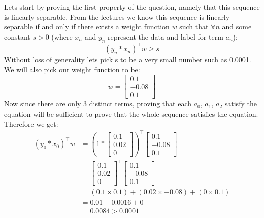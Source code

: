 \documentclass{article}
\begin{document}
\begin{titlepage}
Lets start by proving the first property of the question, namely that this sequence is linearly separable. From the lectures we know this sequence is linearly separable if and only if there exists a weight function $w$ such that $\forall n$ and some constant $s >0 $ (where $x_n$ and $y_n$ represent the data and label for term $a_n$):
\[ (y_n*x_n)^\top w \geq s \]
Without loss of generality lets pick s to be a very small number such as 0.0001. We will also pick our weight function to be:
\[ w = \begin{bmatrix}
0.1\\
-0.08\\
0.1
\end{bmatrix} \]
Now since there are only 3 distinct terms, proving that each $a_0$, $a_1$, $a_2$ satisfy the equation will be sufficient to prove that the whole sequence satisfies the equation. Therefore we get:
\begin{align*} 
(y_0*x_0)^\top w &= \left(1*\begin{bmatrix}
0.1\\
0.02\\
0
\end{bmatrix}\right)^\top\begin{bmatrix}
0.1\\
-0.08\\
0.1
\end{bmatrix} \\
&= \begin{bmatrix}
0.1\\
0.02\\
0
\end{bmatrix}^\top\begin{bmatrix}
0.1\\
-0.08\\
0.1
\end{bmatrix}\\
&= (0.1 \times 0.1) + (0.02 \times -0.08) + (0 \times 0.1) \\
&= 0.01 - 0.0016 + 0 \\
&= 0.0084 > 0.0001
\end{align*}


\end{titlepage}
\end{document}
